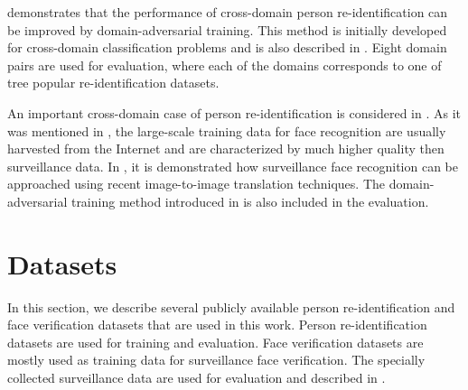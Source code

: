  demonstrates that the performance of cross-domain person re-identification can be improved by domain-adversarial training. This method is initially developed for cross-domain classification problems and is also described in . Eight domain pairs are used for evaluation, where each of the domains corresponds to one of tree popular re-identification datasets. 

An important cross-domain case of person re-identification is considered in . As it was mentioned in , the large-scale training data for face recognition are usually harvested from the Internet and are characterized by much higher quality then surveillance data. In , it is demonstrated how surveillance face recognition can be approached using recent image-to-image translation techniques. The domain-adversarial training method introduced in  is also included in the evaluation.






\section{Datasets}

In this section, we describe several publicly available person re-identification and face verification datasets that are used in this work. Person re-identification datasets are used for training and evaluation. Face verification datasets are mostly used as training data for  surveillance face verification. The specially collected surveillance data are used for evaluation and described in .




